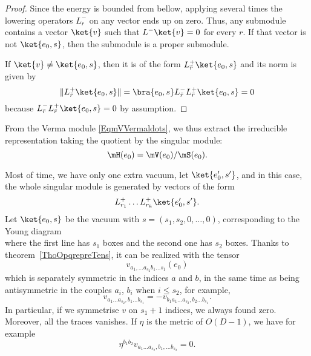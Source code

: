 \begin{proof}
Since the energy is bounded from bellow, applying several times the lowering operators $L^-_r$ on any vector ends up on zero. Thus, any submodule contains a vector $\ket{v}$ such that $L^-\ket{v}=0$ for every $r$. If that vector is not $\ket{e_0,s}$, then the submodule is a proper submodule.

If $\ket{v}\neq\ket{e_0,s}$, then it is of the form $L^+_{\bar r}\ket{e_0,s}$ and its norm is given by
\begin{equation}
	\| L^+_{\bar r}\ket{e_0,s} \|=\bra{e_0,s} L^-_{\bar r}L^+_{\bar r}\ket{e_0,s}=0
\end{equation}
because $L^-_{\bar r}L^+_{\bar r}\ket{e_0,s}=0$ by assumption.
\end{proof}
From the Verma module \eqref{EqmVVermaldots}, we thus extract the irreducible representation taking the quotient by the singular module:
\begin{equation}
	\mH(e_0) = \mV(e_0)/\mS(e_0).
\end{equation}

Most of time, we have only one extra vacuum, let $\ket{e'_0,s'}$, and in this case, the whole singular module is generated by vectors of the form
\begin{equation}
	L^+_{r_1}\ldots L^+_{r_k}\ket{e'_0,s'}.
\end{equation}
Let $\ket{e_0,s}$ be the vacuum with $s=(s_1,s_2,0,\ldots,0)$, corresponding to the Young diagram
\begin{equation}
   
%	
\end{equation}
where the first line has $s_1$ boxes and the second one has $s_2$ boxes. Thanks to theorem~\ref{ThoOpqrepreTens}, it can be realized with the tensor
\begin{equation}
	v_{a_1,\ldots a_{s_2}b_1\ldots s_1}(e_0)
\end{equation}
which is separately symmetric in the indices $a$ and $b$, in the same time as being antisymmetric in the couples $a_i$, $b_i$ when $i\leq s_2$, for example,
\begin{equation}
	v_{a_1\ldots a_{s_2},b_1\ldots b_{s_1}} = -v_{b_1 a_1\ldots a_{s_2},b_2\ldots b_{s_1}}.
\end{equation}
In particular, if we symmetrise $v$ on $s_1+1$ indices, we always found zero. Moreover, all the traces vanishes. If $\eta$ is the metric of $O(D-1)$, we have for example
\begin{equation}
	\eta^{b_1b_2}v_{a_1\ldots a_{s_2},b_1,\ldots b_{s_2}}=0.
\end{equation}

